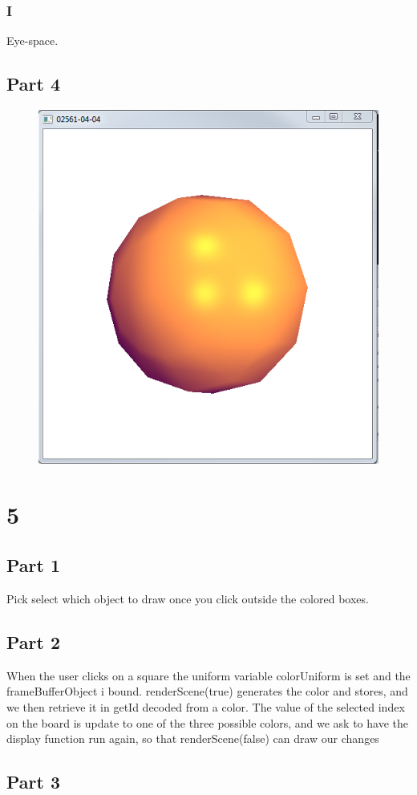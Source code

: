 \documentclass[11pt]{article}
\begin{document}
\subsubsection{I}
Eye-space.

\subsection{Part 4}
\begin{figure}[H]
	\centering
	\includegraphics[width=0.5\linewidth]{images/e04p4}
	\label{fig:e04p4}
\end{figure}

\section{5}
\subsection{Part 1}
Pick select which object to draw once you click outside the colored boxes.

\subsection{Part 2}
When the user clicks on a square the uniform variable colorUniform is set and the frameBufferObject i bound. renderScene(true) generates the color and stores, and we then retrieve it in getId decoded from a color. The value of the selected index on the board is update to one of the three possible colors, and we ask to have the display function run again, so that renderScene(false) can draw our changes

\subsection{Part 3}
\end{document}
